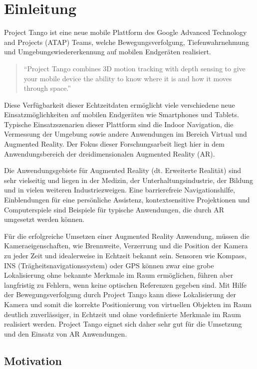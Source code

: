 \chapter{Einleitung}

Project Tango ist eine neue mobile Plattform des Google Advanced Technology and Projects (ATAP) Teams, welche Bewegungsverfolgung, Tiefenwahrnehmung und Umgebungswiedererkennung auf mobilen Endgeräten realisiert.

\begin{quotation}
\enquote{Project Tango combines 3D motion tracking with depth sensing to give your mobile device the ability to know where it is and how it moves through space.}  \citep{Proje19:online}
\end{quotation}

Diese Verfügbarkeit dieser Echtzeitdaten ermöglicht viele verschiedene neue Einsatzmöglichkeiten auf mobilen Endgeräten wie Smartphones und Tablets. Typische Einsatzszenarien dieser Plattform sind die Indoor Navigation, die Vermessung der Umgebung sowie andere Anwendungen im Bereich Virtual und Augmented Reality. Der Fokus dieser Forschungsarbeit liegt hier in dem Anwendungsbereich der dreidimensionalen Augmented Reality (AR). 

Die Anwendungsgebiete für Augmented Reality (dt. Erweiterte Realität) sind sehr vielseitig und liegen in der Medizin, der Unterhaltungsindustrie, der Bildung und in vielen weiteren Industriezweigen. Eine barrierefreie Navigationshilfe, Einblendungen für eine persönliche Assistenz, kontextsensitive Projektionen und Computerspiele sind Beispiele für typische Anwendungen, die durch AR umgesetzt werden können. 

Für die erfolgreiche Umsetzen einer Augmented Reality Anwendung, müssen die Kameraeigenschaften, wie Brennweite, Verzerrung und die Position der Kamera zu jeder Zeit und idealerweise in Echtzeit bekannt sein. Sensoren wie Kompass, INS (Trägheits\-navigations\-system) oder GPS können zwar eine grobe Lokalisierung ohne bekannte Merkmale im Raum ermöglichen, führen aber langfristig zu Fehlern, wenn keine optischen Referenzen gegeben sind. Mit Hilfe der Bewegungsverfolgung durch Project Tango kann diese Lokalisierung der Kamera und somit die korrekte Positionierung von virtuellen Objekten im Raum deutlich zuverlässiger, in Echtzeit und ohne vordefinierte Merkmale im Raum realisiert werden. Project Tango eignet sich daher sehr gut für die Umsetzung und den Einsatz von AR Anwendungen.

\section{Motivation}

